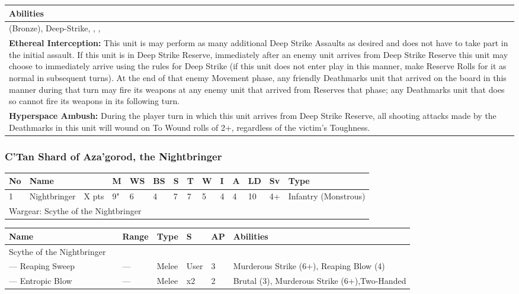 \noindent
\begin{tabular}{||m{532pt}||}
	\hline
	Abilities \\
	\hline
	\quickref{Awakening Protocols} (Bronze), Deep-Strike, \quickref{Hyperspace Hunters}, \quickref{Living Metal}, \quickref{Reanimation Protocols} \\
	\textbf{Ethereal Interception:} This unit is may perform as many additional Deep Strike Assaults as desired and does not have to take part in the initial assault. If this unit is in Deep Strike Reserve, immediately after an enemy unit arrives from Deep Strike Reserve this unit may choose to immediately arrive using the rules for Deep Strike (if this unit does not enter play in this manner, make Reserve Rolls for it as normal in subsequent turns). At the end of that enemy Movement phase, any friendly Deathmarks unit that arrived on the board in this manner during that turn may fire its weapons at any enemy unit that arrived from Reserves that phase; any Deathmarks unit that does so cannot fire its weapons in its following turn. \\
	\textbf{Hyperspace Ambush:} During the player turn in which this unit arrives from Deep Strike Reserve, all shooting attacks made by the Deathmarks in this unit will wound on To Wound rolls of 2+, regardless of the victim’s Toughness. \\
	\hline
\end{tabular}


\newpage
\subsubsection{C'Tan Shard of Aza'gorod, the Nightbringer}

\noindent
\begin{tabular}{||m{10pt} m{95pt} m{30pt} m{11pt} m{11pt} m{11pt} m{11pt} m{11pt} m{11pt} m{11pt} m{11pt} m{11pt} m{11pt} m{125pt}||}
	\hline
	No & Name & & M & WS & BS & S & T & W & I & A & LD & Sv & Type \\
	\hline
	1 & Nightbringer & X pts & 9" & 6 & 4 & 7 & 7 & 5 & 4 & 4 & 10 & 4+ & Infantry (Monstrous)\\
	\hline
	\hline
	\multicolumn{14}{||Z{532 pt}||}{Wargear: Scythe of the Nightbringer}\\
	\hline
\end{tabular}

\noindent
\begin{tabular}{||m{140pt} m{0pt} m{31pt} m{55pt} m{12pt} m{12pt} m{210pt}||}
	\hline
	Name & & Range & Type & S & AP & Abilities \\
	\hline
	Scythe of the Nightbringer & & & & & & \\
	— Reaping Sweep &  & — & Melee & User & 3 & Murderous Strike (6+), Reaping Blow (4) \\
	— Entropic Blow &  & — & Melee & x2 & 2 & Brutal (3), Murderous Strike (6+),Two-Handed \\
	\hline
\end{tabular}

